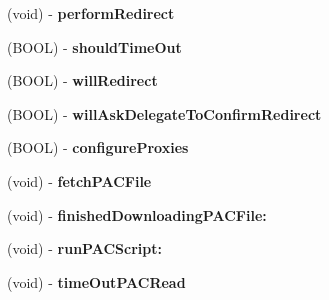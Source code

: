 \begin{DoxyCompactItemize}
\item 
\hypertarget{interface_a_s_i_h_t_t_p_request_07_08_a2862f6f1db8f1146e96470f926561b93}{
(void) -\/ {\bfseries perform\-Redirect}}
\label{interface_a_s_i_h_t_t_p_request_07_08_a2862f6f1db8f1146e96470f926561b93}

\item 
\hypertarget{interface_a_s_i_h_t_t_p_request_07_08_acedb1516f19af14df7b44602b700bae3}{
(\-B\-O\-O\-L) -\/ {\bfseries should\-Time\-Out}}
\label{interface_a_s_i_h_t_t_p_request_07_08_acedb1516f19af14df7b44602b700bae3}

\item 
\hypertarget{interface_a_s_i_h_t_t_p_request_07_08_af19d1ede897c67a86b4d8a62c6395863}{
(\-B\-O\-O\-L) -\/ {\bfseries will\-Redirect}}
\label{interface_a_s_i_h_t_t_p_request_07_08_af19d1ede897c67a86b4d8a62c6395863}

\item 
\hypertarget{interface_a_s_i_h_t_t_p_request_07_08_a38bb6d3bfc36a47f3ace0665762660ae}{
(\-B\-O\-O\-L) -\/ {\bfseries will\-Ask\-Delegate\-To\-Confirm\-Redirect}}
\label{interface_a_s_i_h_t_t_p_request_07_08_a38bb6d3bfc36a47f3ace0665762660ae}

\item 
\hypertarget{interface_a_s_i_h_t_t_p_request_07_08_a81e707733dd891e98faf51eb37093845}{
(\-B\-O\-O\-L) -\/ {\bfseries configure\-Proxies}}
\label{interface_a_s_i_h_t_t_p_request_07_08_a81e707733dd891e98faf51eb37093845}

\item 
\hypertarget{interface_a_s_i_h_t_t_p_request_07_08_a88a7f8b0dfa6f7cc8214d8b52282c6e6}{
(void) -\/ {\bfseries fetch\-P\-A\-C\-File}}
\label{interface_a_s_i_h_t_t_p_request_07_08_a88a7f8b0dfa6f7cc8214d8b52282c6e6}

\item 
\hypertarget{interface_a_s_i_h_t_t_p_request_07_08_af285a652c6aa3f3b35d7e38d81cac828}{
(void) -\/ {\bfseries finished\-Downloading\-P\-A\-C\-File\-:}}
\label{interface_a_s_i_h_t_t_p_request_07_08_af285a652c6aa3f3b35d7e38d81cac828}

\item 
\hypertarget{interface_a_s_i_h_t_t_p_request_07_08_ac7a6d20750ee1df4ce04ee025b012164}{
(void) -\/ {\bfseries run\-P\-A\-C\-Script\-:}}
\label{interface_a_s_i_h_t_t_p_request_07_08_ac7a6d20750ee1df4ce04ee025b012164}

\item 
\hypertarget{interface_a_s_i_h_t_t_p_request_07_08_a831dd38482b5178ecb6b5a3a73d2d6b4}{
(void) -\/ {\bfseries time\-Out\-P\-A\-C\-Read}}
\label{interface_a_s_i_h_t_t_p_request_07_08_a831dd38482b5178ecb6b5a3a73d2d6b4}


\end{DoxyCompactItemize}
